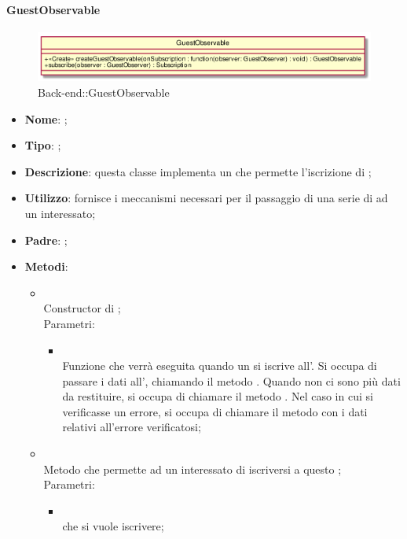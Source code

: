 \hypertarget{GuestObservable_label}{\paragraph{GuestObservable}}
\begin{figure}[h]
	\centering
	\includegraphics[width=\textwidth,height=\textheight,keepaspectratio]{images/ClassGuestObservable.png}
	\caption{Back-end::GuestObservable}
\end{figure}
\begin{itemize}
	\item \textbf{Nome}: ;
	\item \textbf{Tipo}: ;
	\item \textbf{Descrizione}: questa classe implementa un  che permette l'iscrizione di ;
	\item \textbf{Utilizzo}: fornisce i meccanismi necessari per il passaggio di una serie di  ad un  interessato;
	\item \textbf{Padre}: ;
	\item \textbf{Metodi}:
	\begin{itemize}
		\item[]  \\
		Constructor di ;\\
		Parametri:
		\begin{itemize}
			\item {} \\
			Funzione che verrà eseguita quando un  si iscrive all'. Si occupa di passare i dati all', chiamando il metodo . Quando non ci sono più dati da restituire, si occupa di chiamare il metodo . Nel caso in cui si verificasse un errore, si occupa di chiamare il metodo  con i dati relativi all'errore verificatosi;
		\end{itemize}
		\item[]  \\
		Metodo che permette ad un  interessato di iscriversi a questo ;\\
		Parametri:
		\begin{itemize}
			\item {} \\
			 che si vuole iscrivere;
		\end{itemize}
	\end{itemize}
\end{itemize}
\FloatBarrier


